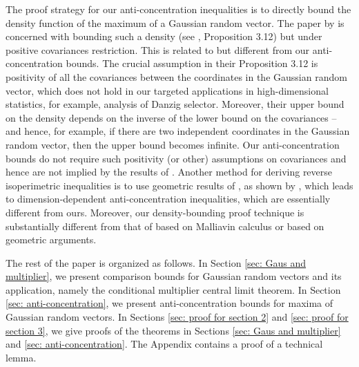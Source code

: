 \documentclass[11pt,reqno]{amsart}
\theoremstyle{definition}
\begin{document}
 The proof strategy for our anti-concentration inequalities is to directly bound the density function of the maximum of a Gaussian random vector. The paper by \cite{NV09} is concerned with bounding such a density (see \cite{NV09}, Proposition 3.12) but under  positive covariances restriction.  This is related to but different from our anti-concentration bounds. The crucial assumption in their Proposition 3.12 is   positivity of all the covariances between the coordinates in the Gaussian random vector, which does not hold in our targeted applications in high-dimensional statistics, for example, analysis of Danzig selector. Moreover, their upper bound on the density depends on the inverse of the lower bound on the covariances -- and hence, for example, if there are two independent coordinates in the Gaussian random vector, then the upper bound becomes infinite. Our anti-concentration bounds do not require such positivity (or other) assumptions on covariances and hence are not implied by the results of \cite{NV09}.   Another method for deriving reverse isoperimetric inequalities is to use geometric results of  \cite{Nazarov03}, as shown by \cite{Klivans08}, which leads to dimension-dependent anti-concentration inequalities, which are essentially different from ours.   Moreover, our density-bounding proof technique is substantially different from that of \cite{NV09} based on Malliavin calculus or  \cite{Nazarov03} based on geometric arguments.



The rest of the paper is organized as follows. In Section \ref{sec: Gaus and multiplier}, we present comparison bounds for Gaussian random vectors and its application, namely the conditional multiplier central limit theorem. In Section \ref{sec: anti-concentration}, we present anti-concentration bounds for maxima of Gaussian random vectors. In Sections \ref{sec: proof for section 2} and \ref{sec: proof for section 3}, we give proofs of the theorems in Sections \ref{sec: Gaus and multiplier} and \ref{sec: anti-concentration}. The Appendix contains a proof of a technical lemma.
\end{document}
